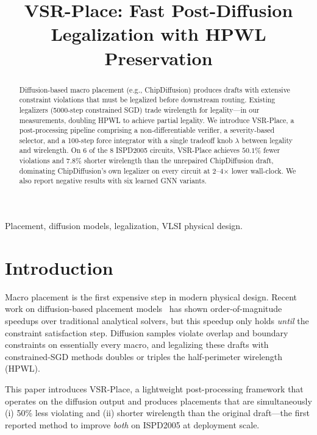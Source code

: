\documentclass[conference]{IEEEtran}
\begin{document}
\title{VSR-Place: Fast Post-Diffusion Legalization with HPWL Preservation}

\author{
}

\maketitle

\begin{abstract}
Diffusion-based macro placement (e.g., ChipDiffusion) produces drafts with extensive constraint violations that must be legalized before downstream routing. Existing legalizers (5000-step constrained SGD) trade wirelength for legality---in our measurements, doubling HPWL to achieve partial legality. We introduce VSR-Place, a post-processing pipeline comprising a non-differentiable verifier, a severity-based selector, and a 100-step force integrator with a single tradeoff knob $\lambda$ between legality and wirelength. On 6 of the 8 ISPD2005 circuits, VSR-Place achieves $50.1\%$ fewer violations and $7.8\%$ shorter wirelength than the unrepaired ChipDiffusion draft, dominating ChipDiffusion's own legalizer on every circuit at 2--4$\times$ lower wall-clock. We also report negative results with six learned GNN variants.
\end{abstract}

\begin{IEEEkeywords}
Placement, diffusion models, legalization, VLSI physical design.
\end{IEEEkeywords}

\section{Introduction}

Macro placement is the first expensive step in modern physical design. Recent work on diffusion-based placement models~\cite{chipdiffusion} has shown order-of-magnitude speedups over traditional analytical solvers, but this speedup only holds \emph{until} the constraint satisfaction step. Diffusion samples violate overlap and boundary constraints on essentially every macro, and legalizing these drafts with constrained-SGD methods doubles or triples the half-perimeter wirelength (HPWL).

This paper introduces VSR-Place, a lightweight post-processing framework that operates on the diffusion output and produces placements that are simultaneously (i) 50\% less violating and (ii) shorter wirelength than the original draft---the first reported method to improve \emph{both} on ISPD2005 at deployment scale.
\end{document}
